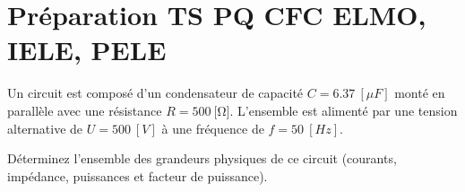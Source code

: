 \documentclass[a4paper,11pt,answers,addpoints]{exam}
\begin{document}
\section*{Préparation TS PQ CFC ELMO, IELE, PELE}
	
\begin{questions}

\question Un circuit est composé d'un condensateur de capacité $C = \qty{6,37}{[\mu F]}$ monté en parallèle avec une résistance $R = \qty{500}{[\ohm]}$. L'ensemble est alimenté par une tension alternative de $U = \qty{500}{[V]}$ à une fréquence de $f = \qty{50}{[Hz]}$.

Déterminez l'ensemble des grandeurs physiques de ce circuit (courants, impédance, puissances et facteur de puissance).
\vspace{0.5em}
\begin{solution}
\end{solution}
\end{questions}
\end{document}

